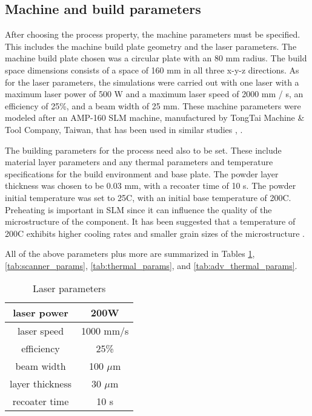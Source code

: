 \documentclass[../main.tex]{subfiles}
\begin{document}
\subsection{Machine and build parameters}\label{ch:params}

After choosing the process property, the machine parameters must be specified. This includes the machine build plate geometry and the laser parameters. The machine build plate chosen was a circular plate with an 80 mm radius. The build space dimensions consists of a space of 160 mm in all three x-y-z directions. As for the laser parameters, the simulations were carried out with one laser with a maximum laser power of 500 W and a maximum laser speed of 2000 mm / s, an efficiency of 25\%, and a beam width of 25 mm. These machine parameters were modeled after an AMP-160 SLM machine, manufactured by TongTai Machine \& Tool Company, Taiwan, that has been used in similar studies \cite{chungpei-hsuStudyLatticeSupport2024}, \cite{chungEvaluationPredictionThermal2024a}.

The building parameters for the process need also to be set. These include material layer parameters and any thermal parameters and temperature specifications for the build environment and base plate. The powder layer thickness was chosen to be 0.03 mm, with a recoater time of 10 s. The powder initial temperature was set to 25\degree C, with an initial base temperature of 200\degree C. Preheating is important in SLM since it can influence the quality of the microstructure of the component. It has been suggested that a temperature of 200\degree C exhibits higher cooling rates and smaller grain sizes of the microstructure \cite{chowdhuryEffectsPreheatingThermal2024}.

All of the above parameters plus more are summarized in Tables \ref{tab:laser_params}, \ref{tab:scanner_params}, \ref{tab:thermal_params}, and \ref{tab:adv_thermal_params}.

\begin{table}
  \centering
  \begin{tabular}{ |c|c| }
    \hline
    laser power & 200W \\
    \hline
    laser speed & 1000 mm/s \\
    \hline
    efficiency & 25\% \\
    \hline
    beam width & 100 $\mu$m \\
    \hline
    layer thickness & 30 $\mu$m \\
    \hline
    recoater time & 10 s \\
    \hline
  \end{tabular}
  \caption{Laser parameters}
  \label{tab:laser_params}
\end{table}
\end{document}
